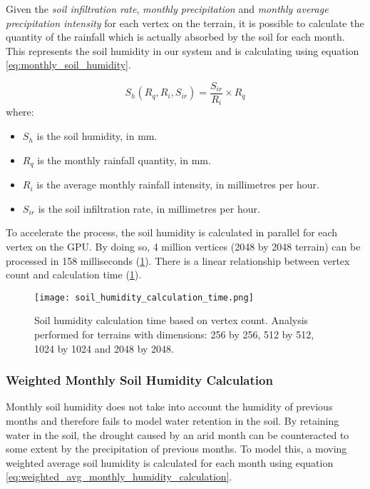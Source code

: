 Given the \textit{soil infiltration rate}, \textit{monthly precipitation} and \textit{monthly average precipitation intensity} for each vertex on the terrain, it is possible to calculate the quantity of the rainfall which is actually absorbed by the soil for each month. This represents the soil humidity in our system and is calculating using equation \ref{eq:monthly_soil_humidity}. 

\begin{equation} \label{eq:monthly_soil_humidity}
	S_{h}(R_{q},R_{i},S_{ir}) = 
	\frac{S_{ir}}{R_{i}} \times R_{q}
\end{equation}
where:
\begin{itemize}
\item \textit{$S_{h}$} is the soil humidity, in mm.\\
\item \textit{$R_{q}$} is the monthly rainfall quantity, in mm. \\
\item \textit{$R_{i}$} is the average monthly rainfall intensity, in millimetres per hour.\\
\item \textit{$S_{ir}$} is the soil infiltration rate, in millimetres per hour.\\
\end{itemize}

To accelerate the process, the soil humidity is calculated in parallel for each vertex on the GPU. By doing so, 4 million vertices (2048 by 2048 terrain) can be processed in 158 milliseconds (\ref{fig:soil_humidity_calculation_time}). There is a linear relationship between vertex count and calculation time (\ref{fig:soil_humidity_calculation_time}).

\begin{figure}
\center
	\texttt{[image: soil\_humidity\_calculation\_time.png]}
	\caption{ Soil humidity calculation time based on vertex count. Analysis performed for terrains with dimensions: 256 by 256, 512 by 512, 1024 by 1024 and 2048 by 2048. }
	\label{fig:soil_humidity_calculation_time}
\end{figure}


\subsubsection{Weighted Monthly Soil Humidity Calculation}

Monthly soil humidity does not take into account the humidity of previous months and therefore fails to model water retention in the soil. By retaining water in the soil, the drought caused by an arid month can be counteracted to some extent by the precipitation of previous months. To model this, a moving weighted average soil humidity is calculated for each month using equation \ref{eq:weighted_avg_monthly_humidity_calculation}.

